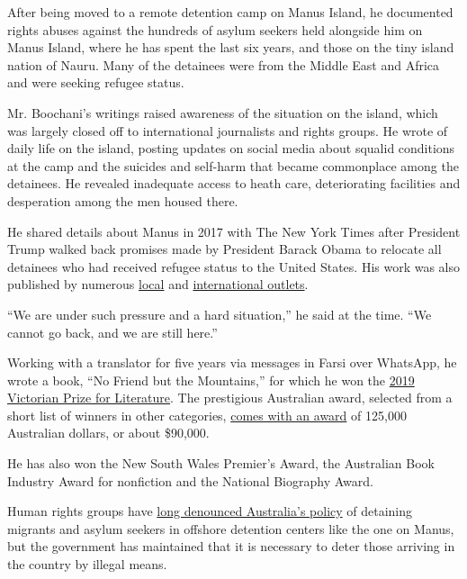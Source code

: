 After being moved to a remote detention camp on Manus Island, he
documented rights abuses against the hundreds of asylum seekers held
alongside him on Manus Island, where he has spent the last six years,
and those on the tiny island nation of Nauru. Many of the detainees were
from the Middle East and Africa and were seeking refugee status.

Mr. Boochani's writings raised awareness of the situation on the island,
which was largely closed off to international journalists and rights
groups. He wrote of daily life on the island, posting updates on social
media about squalid conditions at the camp and the suicides and
self-harm that became commonplace among the detainees. He revealed
inadequate access to heath care, deteriorating facilities and
desperation among the men housed there.

He shared details about Manus in 2017 with The New York Times after
President Trump walked back promises made by President Barack Obama to
relocate all detainees who had received refugee status to the United
States. His work was also published by numerous
\href{https://www.thesaturdaypaper.com.au/contributor/behrouz-boochani}{local}
and
\href{https://www.theguardian.com/profile/behrouz-boochani}{international
outlets}.

``We are under such pressure and a hard situation,'' he said at the
time. ``We cannot go back, and we are still here.''

Working with a translator for five years via messages in Farsi over
WhatsApp, he wrote a book, ``No Friend but the Mountains,'' for which he
won the
\href{https://www.wheelercentre.com/news/behrouz-boochani-wins-the-2019-victorian-prize-for-literature}{2019
Victorian Prize for Literature}. The prestigious Australian award,
selected from a short list of winners in other categories,
\href{https://www.nytimes.com/2019/01/31/world/australia/behrouz-boochani-victorian-prize-manus-island.html}{comes
with an award} of 125,000 Australian dollars, or about \$90,000.

He has also won the New South Wales Premier's Award, the Australian Book
Industry Award for nonfiction and the National Biography Award.

Human rights groups have
\href{https://www.nytimes.com/2019/06/26/world/australia/australia-manus-suicide.html}{long
denounced Australia's policy} of detaining migrants and asylum seekers
in offshore detention centers like the one on Manus, but the government
has maintained that it is necessary to deter those arriving in the
country by illegal means.

